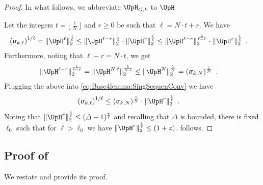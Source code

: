 \documentclass[11pt,reqno]{amsart}
\numberwithin{equation}{section}
\newcommand{\applegreen}[1]{ {\color{applegreen}#1}}
\newcommand{\bluepigment}[1]{{\color{blue(pigment)}#1}}
\newcommand{\byzantine}[1]{{\color{byzantine}#1}}
\newcommand{\bostonuniversityred}[1]{{\color{bostonuniversityred}#1}}
\newcommand{\cadmiumgreen}[1]{{\color{cadmiumgreen}#1}}
\newcommand{\goldenbrown}[1]{{\color{goldenbrown}#1}}
\newcommand{\red}[1]{{\color{red}#1}}
\newcommand{\maxDeg}{{\Delta}}
\newcommand{\nnorm}[3]{\goldenbrown{\|} #1\goldenbrown{\|}^{#2}_{#3}}
\newcommand{\NBMatrix}{\cadmiumgreen{\UpH}_{G,\kk}}
\newcommand{\NBMatrixE}{\byzantine{\UpH}}
\renewcommand{\applegreen}[1]{#1}
\renewcommand{\bluepigment}[1]{#1}
\renewcommand{\byzantine}[1]{#1}
\renewcommand{\bostonuniversityred}[1]{#1}
\renewcommand{\cadmiumgreen}[1]{#1}
\renewcommand{\goldenbrown}[1]{#1}
\renewcommand{\red}[1]{#1}
\newcommand{\kk}{\bluepigment{k}}
\newcommand{\kell}{{\color{green(pigment)}\ell}}%
\newcommand{\kr}{\bostonuniversityred{r}}%
\newcommand{\kz}{\cadmiumgreen{z}}
\renewcommand{\kk}{k}
\renewcommand{\kell}{\ell}
\renewcommand{\kr}{r}
\renewcommand{\kz}{z}
\newcommand{\hsingular}{\upsigma}
\begin{document}
\begin{proof}
In what follows, we abbreviate $\NBMatrix$ to $\NBMatrixE$

Let the integers $t=\lfloor \frac{\kell}{N} \rfloor$ and $\kr\geq 0$ be such that $\kell= N\cdot t+\kr$.
We have 
\begin{align}\label{eq:Base4lemma:SingSequenConv}
\left( \hsingular_{\kk,\kell} \right)^{1/\kell}& = \nnorm{  \NBMatrixE^{\kell}}{\frac{1}{\kell}}{2} \leq 
\nnorm{  \NBMatrixE^{\kell-\kr}}{\frac{1}{\kell}}{2} \cdot \nnorm{  \NBMatrixE^{\kr}}{\frac{1}{\kell}}{2} \leq 
\nnorm{  \NBMatrixE^{\kell-\kr}}{\frac{1}{\kell-\kr}}{2} \cdot \nnorm{ \NBMatrixE^{\kr}}{\frac{1}{\kell}}{2} \enspace. 
\end{align}
Furthermore, noting that $\kell-\kr=N\cdot t$, we get 
\begin{align}
\nnorm{  \NBMatrixE^{\kell-\kr}}{\frac{1}{\kell-\kr}}{2} &= \nnorm{ \NBMatrixE^{N\cdot t}}{\frac{1}{N\cdot t}}{2} \leq 
\nnorm{ \NBMatrixE^N}{\frac{1}{N}}{2} = (\hsingular_{\kk,N})^{\frac{1}{N}}\enspace. 
\end{align}
Plugging the above into \eqref{eq:Base4lemma:SingSequenConv} we have
\begin{align}\nonumber
\left( \hsingular_{\kk,\kell} \right)^{1/\kell}& \leq (\hsingular_{\kk,N})^{\frac{1}{N}} 
\cdot \nnorm{  \NBMatrixE^{\kr}}{\frac{1}{\kell}}{2} \enspace.
\end{align}
Noting that $\nnorm{ \NBMatrixE^{\kr}}{\frac{1}{\kell}}{2}\leq (\maxDeg-1)^{\frac{\kr}{\kell}}$
and recalling that $\maxDeg$ is bounded, there is fixed $\ell_0$ such that 
for $\kell>\ell_0$ we have $\nnorm{ \NBMatrixE^r}{\frac{1}{\kell}}{2}\leq (1+\kz)$.
%
 follows.
\end{proof}










\subsection{{Proof of }}\label{sec:lemma:IsingInfNormBound}
We restate  and provide its proof.

\IsingInfNormBound*
\end{document}
